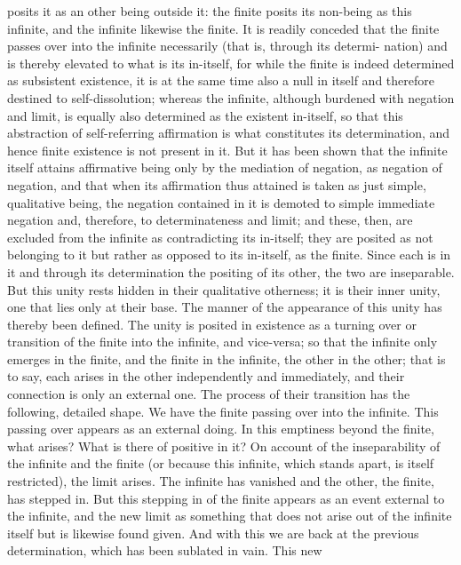 posits it as an other being outside it: the finite posits its non-being as this
infinite, and the infinite likewise the finite. It is readily conceded that the
finite passes over into the infinite necessarily (that is, through its determi-
nation) and is thereby elevated to what is its in-itself, for while the finite
is indeed determined as subsistent existence, it is at the same time also a
null in itself and therefore destined to self-dissolution; whereas the infinite,
although burdened with negation and limit, is equally also determined as
the existent in-itself, so that this abstraction of self-referring affirmation is
what constitutes its determination, and hence finite existence is not present
in it. But it has been shown that the infinite itself attains affirmative being
only by the mediation of negation, as negation of negation, and that when
its affirmation thus attained is taken as just simple, qualitative being, the
negation contained in it is demoted to simple immediate negation and,
therefore, to determinateness and limit; and these, then, are excluded
from the infinite as contradicting its in-itself; they are posited as not
belonging to it but rather as opposed to its in-itself, as the finite. Since each
is in it and through its determination the positing of its other, the two are
inseparable. But this unity rests hidden in their qualitative otherness; it is
their inner unity, one that lies only at their base.
The manner of the appearance of this unity has thereby been defined.
The unity is posited in existence as a turning over or transition of the
finite into the infinite, and vice-versa; so that the infinite only emerges in
the finite, and the finite in the infinite, the other in the other; that is
to say, each arises in the other independently and immediately, and their
connection is only an external one.
The process of their transition has the following, detailed shape. We
have the finite passing over into the infinite. This passing over appears as
an external doing. In this emptiness beyond the finite, what arises? What is
there of positive in it? On account of the inseparability of the infinite and
the finite (or because this infinite, which stands apart, is itself restricted),
the limit arises. The infinite has vanished and the other, the finite, has
stepped in. But this stepping in of the finite appears as an event external
to the infinite, and the new limit as something that does not arise out of
the infinite itself but is likewise found given. And with this we are back
at the previous determination, which has been sublated in vain. This new
